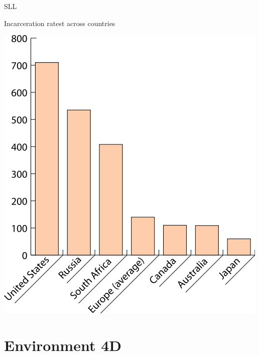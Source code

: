 \begin{chart}{S}{LL}
\caption{Incarceration ratest across countries}
\label{chart:incarceration}
\includegraphics[width=\chartwidth,height=\chartheight]{incarceration}  
\end{chart}
\section{Environment 4D}

